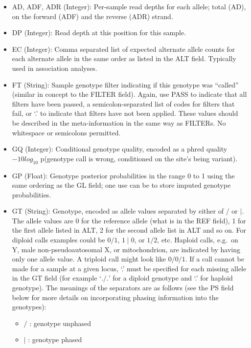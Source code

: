 \documentclass[8pt]{article}
\begin{document}
\begin{itemize}
\renewcommand{\labelitemii}{$\circ$}
  \item AD, ADF, ADR (Integer): Per-sample read depths for each allele; total (AD), on the forward (ADF) and the reverse (ADR) strand.
  \item DP (Integer): Read depth at this position for this sample.
  \item EC (Integer): Comma separated list of expected alternate allele counts for each alternate allele in the same order as listed in the ALT field.
  Typically used in association analyses.
  \item FT (String): Sample genotype filter indicating if this genotype was ``called'' (similar in concept to the FILTER field).
  Again, use PASS to indicate that all filters have been passed, a semicolon-separated list of codes for filters that fail, or `.' to indicate that filters have not been applied.
  These values should be described in the meta-information in the same way as FILTERs.
  No whitespace or semicolons permitted.
  \item GQ (Integer): Conditional genotype quality, encoded as a phred quality $-10log_{10}$ p(genotype call is wrong, conditioned on the site's being variant).
  \item GP (Float): Genotype posterior probabilities in the range 0 to 1 using the same ordering as the GL field; one use can be to store imputed genotype probabilities.
  \item GT (String): Genotype, encoded as allele values separated by either of $/$ or $\mid$.
  The allele values are 0 for the reference allele (what is in the REF field), 1 for the first allele listed in ALT, 2 for the second allele list in ALT and so on.
  For diploid calls examples could be $0/1$, $1\mid0$, or $1/2$, etc.
  Haploid calls, e.g.\ on Y, male non-pseudoautosomal X, or mitochondrion, are indicated by having only one allele value.
  A triploid call might look like $0/0/1$.
  If a call cannot be made for a sample at a given locus, `.' must be specified for each missing allele in the GT field (for example `$./.$' for a diploid genotype and `.' for haploid genotype).
  The meanings of the separators are as follows (see the PS field below for more details on incorporating phasing information into the genotypes):
	\begin{itemize}
	  \item $/$ : genotype unphased
	  \item $\mid$ : genotype phased
	\end{itemize}


\end{itemize}
\end{document}
